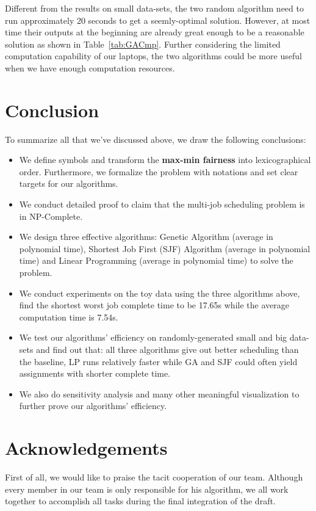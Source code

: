 \documentclass{llncs}
\begin{document}
Different from the results on small data-sets, the two random algorithm need to run approximately 20 seconds to get a seemly-optimal solution. However, at most time their outputs at the beginning are already great enough to be a reasonable solution as shown in Table~\ref{tab:GACmp}. Further considering the limited computation capability of our laptops, the two algorithms could be more useful when we have enough computation resources.
 
\section{Conclusion}
To summarize all that we've discussed above, we draw the following conclusions:
\begin{itemize}
    \item We define symbols and transform the {\bf max-min fairness} into lexicographical order. Furthermore, we formalize the problem with notations and set clear targets for our algorithms.
    
    \item We conduct detailed proof to claim that the multi-job scheduling problem is in NP-Complete.
    
    \item We design three effective algorithms: Genetic Algorithm (average in polynomial time), Shortest Job First (SJF) Algorithm (average in polynomial time) and Linear Programming (average in polynomial time) to solve the problem.
    
    \item We conduct experiments on the toy data using the three algorithms above, find the shortest worst job complete time to be 17.65s while the average computation time is 7.54s.
    
    \item We test our algorithms' efficiency on randomly-generated small and big data-sets and find out that: all three algorithms give out better scheduling than the baseline, LP runs relatively faster while GA and SJF could often yield assignments with shorter complete time.  
    
    \item We also do sensitivity analysis and many other meaningful visualization to further prove our algorithms' efficiency.
\end{itemize}

\section*{Acknowledgements}
First of all, we would like to praise the tacit cooperation of our team. Although every member in our team is only responsible for his algorithm, we all work together to accomplish all tasks during the final integration of the draft.
\end{document}
